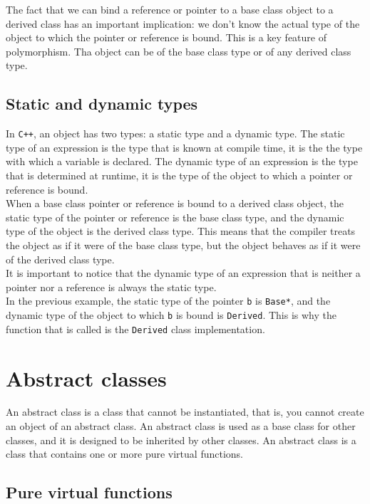 The fact that we can bind a reference or pointer to a base class object to a derived class
has an important implication: we don't know the actual type of the object to which the pointer
or reference is bound. This is a key feature of polymorphism. Tha object can be of the base
class type or of any derived class type.

\subsection{Static and dynamic types}

In \texttt{C++}, an object has two types: a static type and a dynamic type. The static type
of an expression is the type that is known at compile time, it is the the type with which
a variable is declared. The dynamic type of an expression is the type that is determined at
runtime, it is the type of the object to which a pointer or reference is bound.\\

When a base class pointer or reference is bound to a derived class object, the static type
of the pointer or reference is the base class type, and the dynamic type of the object is
the derived class type. This means that the compiler treats the object as if it were of the
base class type, but the object behaves as if it were of the derived class type.\\

It is important to notice that the dynamic type of an expression that is neither a pointer
nor a reference is always the static type.\\

In the previous example, the static type of the pointer \texttt{b} is \texttt{Base*}, and the
dynamic type of the object to which \texttt{b} is bound is \texttt{Derived}. This is why the
function that is called is the \texttt{Derived} class implementation.

\section{Abstract classes}

An abstract class is a class that cannot be instantiated, that is, you cannot create an object
of an abstract class. An abstract class is used as a base class for other classes, and it is
designed to be inherited by other classes. An abstract class is a class that contains one or
more pure virtual functions.

\subsection{Pure virtual functions}

